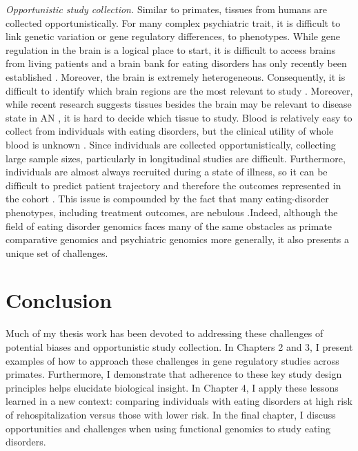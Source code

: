 \textit{Opportunistic study collection.} Similar to primates, tissues from humans are collected opportunistically. For many complex psychiatric trait, it is difficult to link genetic variation or gene regulatory differences, to phenotypes. While gene regulation in the brain is a logical place to start, it is difficult to access brains from living patients and a brain bank for eating disorders has only recently been established \cite{RN4533}. Moreover, the brain is extremely heterogeneous. Consequently, it is difficult to identify which brain regions are the most relevant to study \cite{RN3415}. Moreover, while recent research suggests tissues besides the brain may be relevant to disease state in AN \cite{RN10, RN4567, RN4568}, it is hard to decide which tissue to study. Blood is relatively easy to collect from individuals with eating disorders, but the clinical utility of whole blood is unknown \cite{RN1411}. 
Since individuals are collected opportunistically, collecting large sample sizes, particularly in longitudinal studies are difficult. Furthermore, individuals are almost always recruited during a state of illness, so it can be difficult to predict patient trajectory and therefore the outcomes represented in the cohort \cite{RN4514}. This issue is compounded by the fact that many eating-disorder phenotypes, including treatment outcomes, are nebulous \cite{RN4543}.Indeed, although the field of eating disorder genomics faces many of the same obstacles as primate comparative genomics and psychiatric genomics more generally, it also presents a unique set of challenges.

\section{Conclusion}
Much of my thesis work has been devoted to addressing these challenges of potential biases and opportunistic study collection. In Chapters 2 and 3, I present examples of how to approach these challenges in gene regulatory studies across primates. Furthermore, I demonstrate that adherence to these key study design principles helps elucidate biological insight. In Chapter 4, I apply these lessons learned in a new context: comparing individuals with eating disorders at high risk of rehospitalization versus those with lower risk. In the final chapter, I discuss opportunities and challenges when using functional genomics to study eating disorders. 

